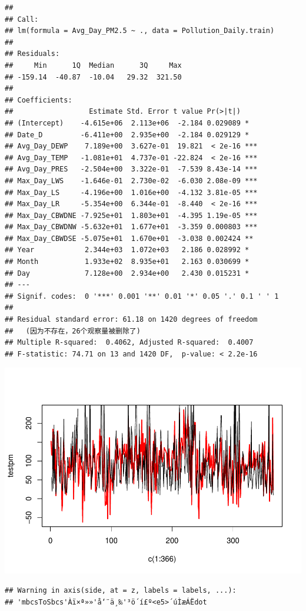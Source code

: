 \documentclass[
]{article}
\begin{document}
\begin{verbatim}
## 
## Call:
## lm(formula = Avg_Day_PM2.5 ~ ., data = Pollution_Daily.train)
## 
## Residuals:
##     Min      1Q  Median      3Q     Max 
## -159.14  -40.87  -10.04   29.32  321.50 
## 
## Coefficients:
##                  Estimate Std. Error t value Pr(>|t|)    
## (Intercept)    -4.615e+06  2.113e+06  -2.184 0.029089 *  
## Date_D         -6.411e+00  2.935e+00  -2.184 0.029129 *  
## Avg_Day_DEWP    7.189e+00  3.627e-01  19.821  < 2e-16 ***
## Avg_Day_TEMP   -1.081e+01  4.737e-01 -22.824  < 2e-16 ***
## Avg_Day_PRES   -2.504e+00  3.322e-01  -7.539 8.43e-14 ***
## Max_Day_LWS    -1.646e-01  2.730e-02  -6.030 2.08e-09 ***
## Max_Day_LS     -4.196e+00  1.016e+00  -4.132 3.81e-05 ***
## Max_Day_LR     -5.354e+00  6.344e-01  -8.440  < 2e-16 ***
## Max_Day_CBWDNE -7.925e+01  1.803e+01  -4.395 1.19e-05 ***
## Max_Day_CBWDNW -5.632e+01  1.677e+01  -3.359 0.000803 ***
## Max_Day_CBWDSE -5.075e+01  1.670e+01  -3.038 0.002424 ** 
## Year            2.344e+03  1.072e+03   2.186 0.028992 *  
## Month           1.933e+02  8.935e+01   2.163 0.030699 *  
## Day             7.128e+00  2.934e+00   2.430 0.015231 *  
## ---
## Signif. codes:  0 '***' 0.001 '**' 0.01 '*' 0.05 '.' 0.1 ' ' 1
## 
## Residual standard error: 61.18 on 1420 degrees of freedom
##   (因为不存在，26个观察量被删除了)
## Multiple R-squared:  0.4062, Adjusted R-squared:  0.4007 
## F-statistic: 74.71 on 13 and 1420 DF,  p-value: < 2.2e-16
\end{verbatim}

\includegraphics{Final_Project_1_files/figure-latex/unnamed-chunk-7-1.pdf}

\begin{verbatim}
## Warning in axis(side, at = z, labels = labels, ...):
## 'mbcsToSbcs'Àï×ª»»'å‘¨ä¸‰'³ö´í£º<e5>´úÌæÁËdot
\end{verbatim}
\end{document}
